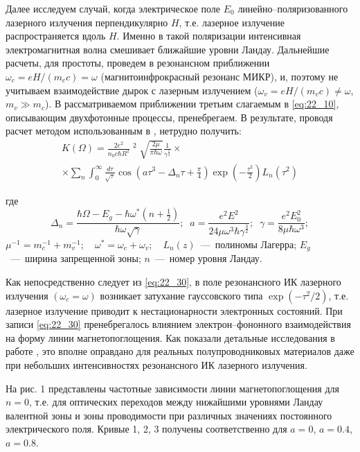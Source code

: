 {Далее исследуем случай, когда электрическое поле $E_{0} $ линейно--поляризованного лазерного излучения перпендикулярно $H$, т.е. лазерное излучение распространяется вдоль $H$. Именно в такой поляризации интенсивная электромагнитная волна смешивает ближайшие уровни Ландау. Дальнейшие расчеты, для простоты, проведем в резонансном приближении $\omega _{c} =eH/(m_{c} c)=\omega $ (магнитоинфрокрасный резонанс МИКР), и, поэтому не учитываем взаимодействие дырок с лазерным излучением ($\omega _{v} =eH/(m_{v} c)\ne \omega $, $m_{v} \gg m_{c} $). В рассматриваемом приближении третьим слагаемым в \eqref{eq:22_10}, описывающим двухфотонные процессы, пренебрегаем. В результате, проводя расчет методом использованным в \cite{Sinyavskii1974,Sinyavskii2002}, нетрудно получить: 
\begin{multline} \label{eq:22_30} 
K(\Omega )=\frac{2e^{2} }{n_{0} c\hbar R^{2} } \mathop{\left|\frac{p_{cv} \xi _{0} }{m_{0} } \right|}\nolimits^{2} \sqrt{\frac{2\mu }{\pi \hbar \omega } } \frac{1}{\gamma ^{{\tfrac{1}{4}} } } \times \\
\times \sum _{n} \int _{0}^{\infty } \frac{d\tau }{\sqrt{\tau } } \cos \left(a\tau ^{3} -\Delta _{n} \tau +\frac{\pi }{4} \right)\exp \left(-\frac{\tau ^{2} }{2} \right)L_{n} (\tau ^{2} )
\end{multline} 

где 
\[
\Delta _{n} =\frac{\hbar \Omega -E_{g} -\hbar \omega ^{*} \left(n+{\tfrac{1}{2}} \right)}{\hbar \omega \sqrt{\gamma } } ;\; \; a=\frac{e^{2} E^{2} }{24\mu \omega ^{3} \hbar \gamma ^{{\tfrac{3}{2}} } } ;\; \; \gamma =\frac{e^{2} E_{0}^{2} }{8\mu \hbar \omega ^{3} } ;
\] 
$\mu ^{-1} =m_{c}^{-1} +m_{v}^{-1} ;$~~$\omega ^{*} =\omega _{c} +\omega _{v} ;$~~$L_{n} (z)$~---~полиномы Лагерра; $E_{g} $~---~ширина запрещенной зоны; $n$~---~номер уровня Ландау. 

\noindent Как непосредственно следует из \eqref{eq:22_30}, в поле резонансного ИК лазерного излучения $(\omega _{c} =\omega )$ возникает затухание гауссовского типа $\exp \left(-\tau ^{2} /2\right)$, т.е. лазерное излучение приводит к нестационарности электронных состояний. При записи \eqref{eq:22_30} пренебрегалось влиянием электрон--фононного взаимодействия на форму линии магнетопоглощения. Как показали детальные исследования в работе \cite{Sinyavskii1976}, это вполне оправдано для реальных полупроводниковых материалов даже при небольших интенсивностях резонансного ИК лазерного излучения. 

На рис. 1 представлены частотные зависимости линии магнетопоглощения для $n=0$, т.е. для оптических переходов между нижайшими уровнями Ландау валентной зоны и зоны проводимости при различных значениях постоянного электрического поля. Кривые 1, 2, 3 получены соответственно для $a=0$, $a=0.4$, $a=0.8$.

}
